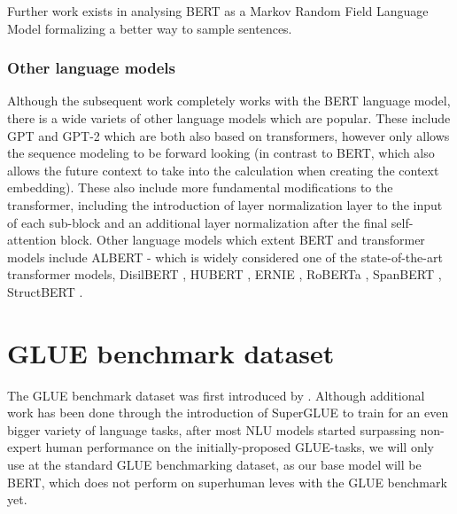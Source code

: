 \documentclass[a4paper,12pt,twoside,openright]{report}
\begin{document}
Further work exists in analysing BERT as a Markov Random Field Language Model \cite{wang19e} formalizing a better way to sample sentences.

\subsubsection{Other language models}

Although the subsequent work completely works with the BERT language model, there is a wide variets of other language models which are popular.
These include GPT \cite{radford18} and GPT-2 \cite{radford19} which are both also based on transformers, however only allows the sequence modeling to be forward looking (in contrast to BERT, which also allows the future context to take into the calculation when creating the context embedding).
These also include more fundamental modifications to the transformer, including the introduction of layer normalization \cite{ba16} layer to the input of each sub-block and an additional layer normalization after the final self-attention block. 
Other language models which extent BERT and transformer models include ALBERT \cite{lan20} - which is widely considered one of the state-of-the-art transformer models, DisilBERT \cite{sanh19}, HUBERT \cite{moradshahi19}, ERNIE \cite{sun19}, RoBERTa \cite{liu19}, SpanBERT \cite{joshi19}, StructBERT \cite{wang19d}.


\section{GLUE benchmark dataset}

The GLUE benchmark dataset was first introduced by \cite{wang19}.
Although additional work has been done through the introduction of SuperGLUE \cite{wang19b} to train for an even bigger variety of language tasks, after most NLU models started surpassing non-expert human performance on the initially-proposed GLUE-tasks, we will only use at the standard GLUE benchmarking dataset, as our base model will be BERT, which does not perform on superhuman leves with the GLUE benchmark yet.
\end{document}
